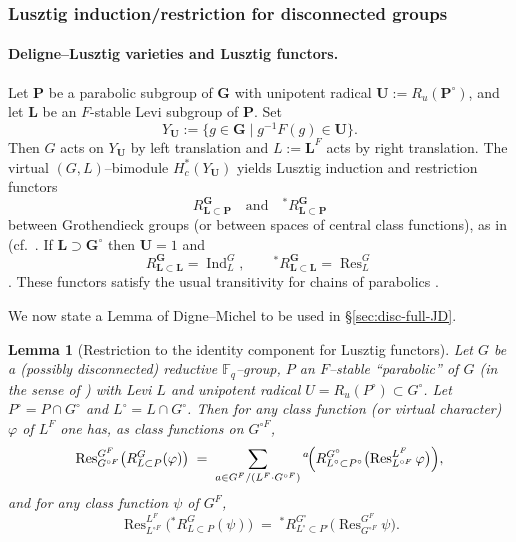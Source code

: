 \documentclass{amsart}
\theoremstyle{plain}
\numberwithin{equation}{section}
\newtheorem{lemma}[theorem]{Lemma}
\theoremstyle{definition}
\newcommand{\Ind}{\operatorname{Ind}}
\newcommand{\Res}{\operatorname{Res}}
\newcommand{\F}{\mathbb{F}}
\begin{document}
\subsubsection{Lusztig induction/restriction for disconnected groups}

\paragraph{Deligne--Lusztig varieties and Lusztig functors.}
Let $\mathbf P$ be a parabolic subgroup of $\mathbf G$ with unipotent radical $\mathbf U:=R_u(\mathbf P^\circ)$,
and let $\mathbf L$ be an $F$-stable Levi subgroup of $\mathbf P$.
Set
\[
Y_{\mathbf U}:=\{g\in \mathbf G \mid g^{-1}F(g)\in \mathbf U\}.
\]
Then $G$ acts on $Y_{\mathbf U}$ by left translation and $L:=\mathbf L^F$ acts by right translation.
The virtual $(G,L)$--bimodule $H_c^\ast(Y_{\mathbf U})$ yields Lusztig induction and restriction functors
\[
R_{\mathbf L\subset \mathbf P}^{\mathbf G} \quad\text{and}\quad {}^\ast R_{\mathbf L\subset \mathbf P}^{\mathbf G}
\]
between Grothendieck groups (or between spaces of central class functions), as in
{\cite[\S6.3]{Bonnafe1999Produit}} (cf.\ {\cite[Def.~2.2]{DigneMichel94}}.
If $\mathbf L\supset \mathbf G^\circ$ then $\mathbf U=1$ and
\[
R_{\mathbf L\subset \mathbf L}^{\mathbf G}=\Ind_L^G,\qquad
{}^\ast R_{\mathbf L\subset \mathbf L}^{\mathbf G}=\Res_L^G
\]
{\cite[Prop.~6.3.2]{Bonnafe1999Produit}}.
These functors satisfy the usual transitivity for chains of parabolics
{\cite[Prop.~6.3.3]{Bonnafe1999Produit}}.

\medskip
We now state a Lemma of Digne–Michel \cite[Cor. 2.4]{DigneMichel94} to be used in \S \ref{sec:disc-full-JD}.
\begin{lemma}[Restriction to the identity component for Lusztig functors]\label{lem:DM94-restriction-to-identity-component}
Let $G$ be a (possibly disconnected) reductive $\F_q$--group, $P$ an $F$--stable ``parabolic'' of $G$
(in the sense of \cite[Def.\ 1.4]{DigneMichel94}) with Levi $L$ and unipotent radical $U=R_u(P^\circ)\subset G^\circ$.
Let $P^\circ=P\cap G^\circ$ and $L^\circ=L\cap G^\circ$.
Then for any class function (or virtual character) $\varphi$ of $L^F$ one has, as class functions on $G^{\circ F}$,
\[
\Res^{G^F}_{G^{\circ F}}\bigl(R^G_{L\subset P}(\varphi)\bigr)
\;=\;
\sum_{a\in G^F/(L^F\cdot G^{\circ F})} {}^{a}\!\Bigl(R^{G^\circ}_{L^\circ\subset P^\circ}\bigl(\Res^{L^F}_{L^{\circ F}}\varphi\bigr)\Bigr),
\]
and for any class function $\psi$ of $G^F$,
\[
\Res^{L^F}_{L^{\circ F}}\bigl({}^*R^G_{L\subset P}(\psi)\bigr)
\;=\;
{}^*R^{G^\circ}_{L^\circ\subset P^\circ}\bigl(\Res^{G^F}_{G^{\circ F}}\psi\bigr).
\]
\end{lemma}
\end{document}
